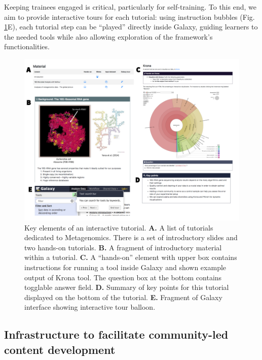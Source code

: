 Keeping trainees engaged is critical, particularly for self-training. To this end, we aim to provide interactive tours for each tutorial: using instruction bubbles (Fig. \ref{fig:metagenomics}E), each tutorial step can be “played” directly inside Galaxy, guiding learners to the needed tools while also allowing exploration of the framework’s functionalities.

\begin{figure}
    \centering
    \includegraphics[width=\textwidth]{chapters/images/training/training-figure-metagenomics.png}
    \caption{ Key elements of an interactive tutorial. \textbf{A.} A list of tutorials dedicated to Metagenomics. There is a set of introductory slides and two hands-on tutorials. \textbf{B.} A fragment of introductory material within a tutorial. \textbf{C.} A “hands-on” element with upper box contains instructions for running a tool inside Galaxy and shown example output of Krona tool. The question box at the bottom contains togglable answer field. \textbf{D.} Summary of key points for this tutorial displayed on the bottom of the tutorial. \textbf{E.} Fragment of Galaxy interface showing interactive tour balloon.  }
    \label{fig:metagenomics}
\end{figure}


\subsection*{Infrastructure to facilitate community-led content development}

